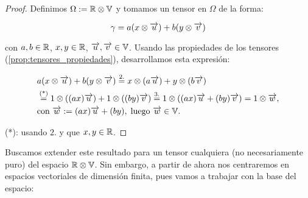 \begin{proof}
    Definimos $\Omega := \mathbb{R} \otimes \mathbb{V}$ y tomamos un tensor en $\Omega$ de la forma:

    \begin{equation}
        \gamma = a(x \otimes \overrightarrow{u}) + b(y \otimes \overrightarrow{v})
    \end{equation}

    con $a, b \in \mathbb{R}$, $x, y \in \mathbb{R}$, $\overrightarrow{u}, \overrightarrow{v} \in \mathbb{V}$. Usando las propiedades de los tensores (\ref{prop:tensores_propiedades}), desarrollamos esta expresión:

    \begin{equation}
        \begin{split}
            & a(x \otimes \overrightarrow{u}) + b(y \otimes \overrightarrow{v}) \stackrel{\text{2.}}{=} x \otimes (a\overrightarrow{u}) + y \otimes (b\overrightarrow{v}) \\
            & \stackrel{\text{(*)}}{=} 1 \otimes ((ax) \overrightarrow{u}) + 1 \otimes ((by) \overrightarrow{v}) \stackrel{\text{3.}}{=} 1 \otimes ((ax)\overrightarrow{u} + (by) \overrightarrow{v}) = 1 \otimes \overrightarrow{w}, \\
            &\text{con } \overrightarrow{w} := (ax)\overrightarrow{u} + (by), \; \text{luego } \overrightarrow{w} \in \mathbb{V}.
        \end{split}
    \end{equation}

    (*): usando $2.$ y que $x, y \in \mathbb{R}$.


\end{proof}

Buscamos extender este resultado para un tensor cualquiera (no necesariamente puro) del espacio $\mathbb{R} \otimes \mathbb{V}$. Sin embargo, a partir de ahora nos centraremos en espacios vectoriales de dimensión finita, pues vamos a trabajar con la base del espacio:

